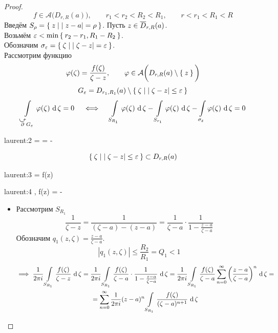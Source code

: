 \begin{proof}
	$$ f \in \mathcal A \bigg( D_{r, R}(a) \bigg), \qquad r_1 < r_2 < R_2 < R_1, \qquad r < r_1 < R_1 < R $$
	Введём $ S_\rho = \Set{ z \mid |z - a| = \rho} $.
	Пусть $ z \in \overline D_{r, R}(a) $. \\
	Возьмём $ \varepsilon < \min\Set{ r_2 - r_1, R_1 - R_2} $. \\
	Обозначим $ \sigma_\varepsilon = \Set{\zeta \mid |\zeta - z| = \varepsilon} $. \\
	Рассмотрим функцию
	$$ \varphi(\zeta) = \frac{f(\zeta)}{\zeta - z}, \qquad \varphi \in \mathcal A \bigg( D_{r, R}(a) \setminus \Set{z} \bigg) $$
	$$ G_\varepsilon = D_{r_1, R_1}(a) \setminus \Set{\zeta \mid |\zeta - z| \le \varepsilon} $$
	$$ \cint[\zeta]{\curvedir \partial G_\eps}{\vphi(\zeta)} = 0 \quad
	\iff \quad \cint[\zeta]{S_{R_1}}{\vphi(\zeta)} - \cint[\zeta]{S_{r_1}}{\vphi(\zeta)} - \cint[\zeta]{\sigma_\eps}{\vphi(\zeta)} = 0 $$
	\begin{equ}{laurent:2}
		\implies {} =  =  - 
	\end{equ}
	$$ \Set{\zeta \mid |\zeta - z| \le \varepsilon} \subset D_{r, R}(a) $$
	\begin{equ}{laurent:3}
		 = f(z)
	\end{equ}
	\begin{equ}{laurent:4}
		,  \implies f(z) =   - 
	\end{equ}
	\begin{itemize}
		\item Рассмотрим $ S_{R_1} $
			$$ \frac1{\zeta - z} = \frac1{(\zeta - a) - (z - a)} = \frac1{\zeta - a} \cdot \frac1{1 - \frac{z - a}{\zeta - a}} $$
			Обозначим $ q_1(z, \zeta) = \frac{z - a}{\zeta - a} $.
			$$ |q_1(z, \zeta)| \le \frac{R_2}{R_1} = Q_1 < 1 $$
			\begin{multline}\lbl{laurent:6}
				\implies \frac1{2\pi i} \cint[\zeta]{S_{R_1}}{\frac{f(\zeta)}{\zeta - z}} = \frac1{2\pi i}\cint[\zeta]{S_{R_1}}{\frac{f(\zeta)}{\zeta - a} \cdot \frac1{1 - \frac{z - a}{\zeta - a}}} = \frac1{2\pi i}\cint[\zeta]{S_{R_1}}{\frac{f(\zeta)}{\zeta - a} \sum_{n = 0}^\infty \bigg( \frac{z - a}{\zeta - a} \bigg)^n} = \\
				= \sum_{n = 0}^\infty \frac1{2\pi i}(z - a)^n \cint[\zeta]{S_{R_1}}{\frac{f(\zeta)}{(\zeta - a)^{n + 1}}}

\end{multline}
\end{itemize}
\end{proof}

